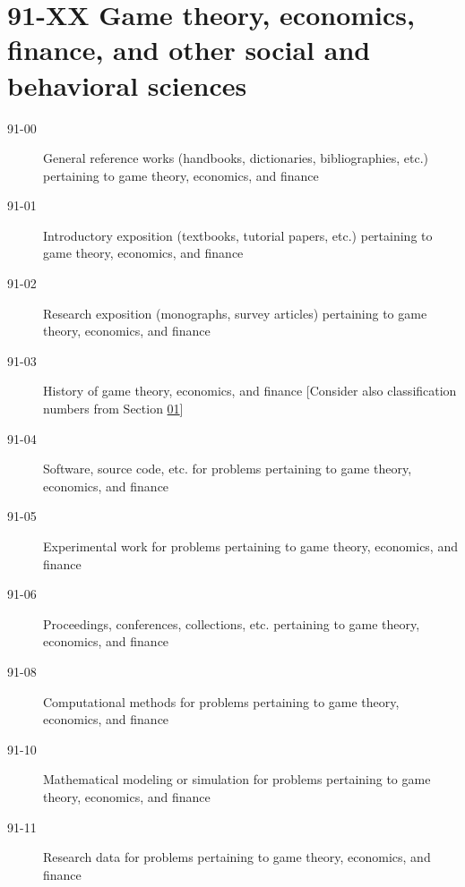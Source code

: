 \documentclass[letterpaper]{article}
\begin{document}
\section*{91-XX Game theory, economics, finance, and other social and behavioral sciences }\label{91-XX}
\begin{description}
\item [91-00]\label{91-00} General reference works (handbooks, dictionaries, bibliographies, etc.) pertaining to game theory, economics, and finance
\item [91-01]\label{91-01} Introductory exposition (textbooks, tutorial papers, etc.) pertaining to game theory, economics, and finance
\item [91-02]\label{91-02} Research exposition (monographs, survey articles) pertaining to game theory, economics, and finance
\item [91-03]\label{91-03} History of game theory, economics, and finance [Consider also classification numbers from Section \hyperref[01-XX]{01}]
\item [91-04]\label{91-04} Software, source code, etc. for problems pertaining to game theory, economics, and finance
\item [91-05]\label{91-05} Experimental work for problems pertaining to game theory, economics, and finance
\item [91-06]\label{91-06} Proceedings, conferences, collections, etc. pertaining to game theory, economics, and finance
\item [91-08]\label{91-08} Computational methods for problems pertaining to game theory, economics, and finance
\item [91-10]\label{91-10} Mathematical modeling or simulation for problems pertaining to game theory, economics, and finance
\item [91-11]\label{91-11} Research data for problems pertaining to game theory, economics, and finance
\end{description}
\end{document}

